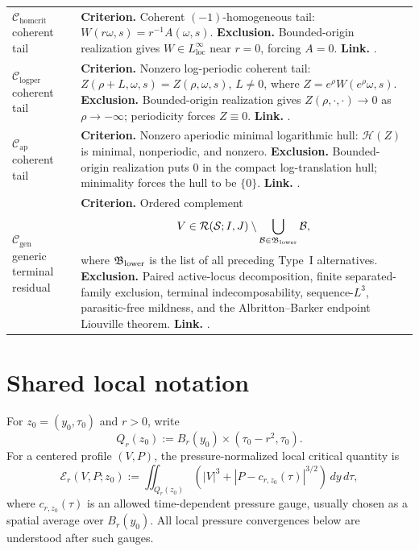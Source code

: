 \documentclass[11pt]{amsart}
\numberwithin{equation}{section}
\theoremstyle{plain}
\theoremstyle{definition}
\theoremstyle{remark}
\newcommand{\loc}{\mathrm{loc}}
\newcommand{\calS}{\mathcal S}
\newcommand{\calR}{\mathcal R}
\newcommand{\calE}{\mathcal E}
\newcommand{\Cgen}{\mathcal C_{\mathrm{gen}}}
\newcommand{\Chomcrit}{\mathcal C_{\mathrm{homcrit}}}
\newcommand{\Clogper}{\mathcal C_{\mathrm{logper}}}
\newcommand{\Capcrit}{\mathcal C_{\mathrm{ap}}}
\begin{document}
\begin{longtable}{@{}L{1.20in}L{4.65in}@{}}
\(\Chomcrit\) coherent tail &
\textbf{Criterion.}  Coherent \((-1)\)-homogeneous tail:
\(W(r\omega,s)=r^{-1}A(\omega,s)\).
\textbf{Exclusion.}  Bounded-origin realization gives
\(W\in L^\infty_{\loc}\) near \(r=0\), forcing \(A=0\).
\textbf{Link.}  .\\

\(\Clogper\) coherent tail &
\textbf{Criterion.}  Nonzero log-periodic coherent tail:
\(Z(\rho+L,\omega,s)=Z(\rho,\omega,s)\), \(L\ne0\), where
\(Z=e^\rho W(e^\rho\omega,s)\).
\textbf{Exclusion.}  Bounded-origin realization gives
\(Z(\rho,\cdot,\cdot)\to0\) as \(\rho\to-\infty\); periodicity forces
\(Z\equiv0\).
\textbf{Link.}  .\\

\(\Capcrit\) coherent tail &
\textbf{Criterion.}  Nonzero aperiodic minimal logarithmic hull:
\(\mathcal H(Z)\) is minimal, nonperiodic, and nonzero.
\textbf{Exclusion.}  Bounded-origin realization puts \(0\) in the compact
log-translation hull; minimality forces the hull to be \(\{0\}\).
\textbf{Link.}  .\\

\(\Cgen\) generic terminal residual &
\textbf{Criterion.}  Ordered complement
\[
   V\in\calR(\calS;I,J)
   \setminus\bigcup_{\mathcal B\in\mathfrak B_{\rm lower}}\mathcal B ,
\]
where \(\mathfrak B_{\rm lower}\) is the list of all preceding Type~I
alternatives.
\textbf{Exclusion.}  Paired active-locus decomposition, finite
separated-family exclusion, terminal indecomposability, sequence-\(L^3\),
parasitic-free mildness, and the Albritton--Barker endpoint Liouville theorem.
\textbf{Link.}  .\\
\end{longtable}
\endgroup

\section{Shared local notation}
\label{sec:shared-notation}

For \(z_0=(y_0,\tau_0)\) and \(r>0\), write
\[
   Q_r(z_0):=B_r(y_0)\times(\tau_0-r^2,\tau_0).
\]
For a centered profile \((V,P)\), the pressure-normalized local critical
quantity is
\begin{equation}\label{eq:local-energy-main}
   \calE_r(V,P;z_0)
   :=
   \iint_{Q_r(z_0)}
   \left(|V|^3+|P-c_{r,z_0}(\tau)|^{3/2}\right)\,dy\,d\tau,
\end{equation}
where \(c_{r,z_0}(\tau)\) is an allowed time-dependent pressure gauge, usually
chosen as a spatial average over \(B_r(y_0)\).  All local pressure
convergences below are understood after such gauges.
\end{document}
